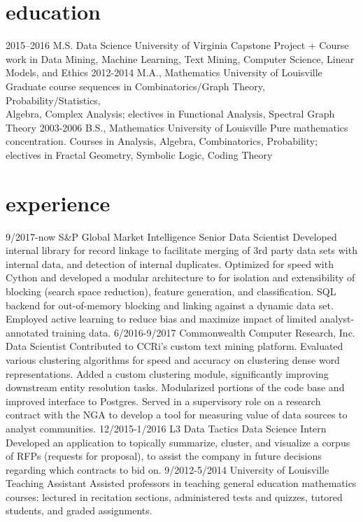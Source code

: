 \documentclass[letterpaper,10pt]{hawthorn-resume}
\begin{document}
\begin{body}
\section{education}
\begin{entrylist}
  \entry
    {2015–2016}
    {M.S. Data Science}
    {University of Virginia}
    {Capstone Project + Course work in Data Mining, Machine Learning,
    Text Mining, Computer Science, Linear Models, and Ethics}
  \entry
    {2012-2014}
    {M.A., Mathematics}
    {University of Louisville}
    {Graduate course sequences in Combinatorics/Graph Theory, Probability/Statistics,
    \\Algebra, Complex Analysis; electives in Functional Analysis, Spectral Graph Theory}
  \entry
    {2003-2006}
    {B.S., Mathematics}
    {University of Louisville}
    {Pure mathematics concentration.  Courses in Analysis, Algebra, Combinatorics, Probability; 
    \\electives in Fractal Geometry, Symbolic Logic, Coding Theory}
\end{entrylist}

\section{experience}
\begin{entrylist}
  \entry
    {9/2017-now}
    {S\&P Global Market Intelligence}
    {Senior Data Scientist}
    {Developed internal library for record linkage to facilitate merging of 3rd party data sets with internal data, and detection of internal duplicates. Optimized for speed with Cython and developed a modular architecture to for isolation and extensibility of blocking (search space reduction), feature generation, and classification. SQL backend for out-of-memory blocking and linking against a dynamic data set. Employed active learning to reduce bias and maximize impact of limited analyst-annotated training data.}
  \entry
    {6/2016-9/2017}
    {Commonwealth Computer Research, Inc.}
    {Data Scientist}
    {Contributed to CCRi's custom text mining platform. Evaluated various clustering algorithms for speed and accuracy on clustering dense word representations. Added a custom clustering module, significantly improving downstream entity resolution tasks. Modularized portions of the code base and improved interface to Postgres. Served in a supervisory role on a research contract with the NGA to develop a tool for measuring value of data sources to analyst communities.}
  \entry
    {12/2015-1/2016}
    {L3 Data Tactics}
    {Data Science Intern}
    {Developed an application to topically summarize, cluster, and visualize a corpus of RFPs (requests for proposal), to assist the company in future decisions regarding which contracts to bid on.}
  \entry
    {9/2012-5/2014}
    {University of Louisville}
    {Teaching Assistant}
    {Assisted professors in teaching general education mathematics courses: lectured in recitation sections, administered tests and quizzes, tutored students, and graded assignments.}
\end{entrylist}


\end{body}
\end{document}
